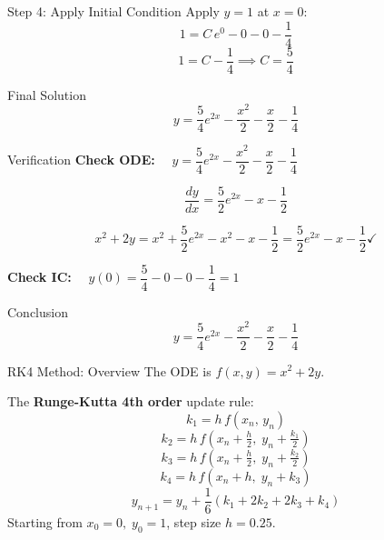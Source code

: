 \documentclass{beamer}
\begin{document}
\begin{frame}{Step 4: Apply Initial Condition}
Apply $y = 1$ at $x = 0$:
\[
1 = C\,e^{0} - 0 - 0 - \frac{1}{4}
\]
\[
1 = C - \frac{1}{4} \implies C = \frac{5}{4}
\]

\vspace{0.5em}
\begin{block}{Final Solution}
\[
y = \frac{5}{4}e^{2x} - \frac{x^2}{2} - \frac{x}{2} - \frac{1}{4}
\]
\end{block}
\end{frame}

\begin{frame}{Verification}
\textbf{Check ODE:} $\quad y = \dfrac{5}{4}e^{2x} - \dfrac{x^2}{2} - \dfrac{x}{2} - \dfrac{1}{4}$

\[
\frac{dy}{dx} = \frac{5}{2}e^{2x} - x - \frac{1}{2}
\]

\[
x^2 + 2y = x^2 + \frac{5}{2}e^{2x} - x^2 - x - \frac{1}{2} = \frac{5}{2}e^{2x} - x - \frac{1}{2} \checkmark
\]

\vspace{0.4em}
\textbf{Check IC:} $\quad y(0) = \dfrac{5}{4} - 0 - 0 - \dfrac{1}{4} = 1$ \checkmark

\vspace{0.5em}
\begin{block}{Conclusion}
\[
y = \frac{5}{4}e^{2x} - \frac{x^2}{2} - \frac{x}{2} - \frac{1}{4}
\]
\end{block}
\end{frame}

\begin{frame}{RK4 Method: Overview}
The ODE is $f(x,y) = x^2 + 2y$.

\vspace{0.3em}
The \textbf{Runge-Kutta 4th order} update rule:
\[
k_1 = h\,f(x_n,\, y_n)
\]
\[
k_2 = h\,f\!\left(x_n + \tfrac{h}{2},\; y_n + \tfrac{k_1}{2}\right)
\]
\[
k_3 = h\,f\!\left(x_n + \tfrac{h}{2},\; y_n + \tfrac{k_2}{2}\right)
\]
\[
k_4 = h\,f\!\left(x_n + h,\; y_n + k_3\right)
\]
\[
y_{n+1} = y_n + \frac{1}{6}(k_1 + 2k_2 + 2k_3 + k_4)
\]
Starting from $x_0 = 0,\; y_0 = 1$, step size $h = 0.25$.
\end{frame}
\end{document}
